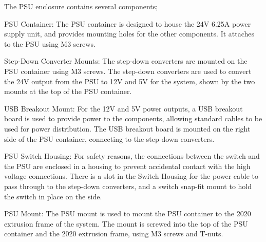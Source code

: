 The PSU enclosure contains several components;
\begin{mylist}
    \item PSU Container: The PSU container is designed to house the 24V 6.25A power supply unit, and provides mounting holes for the other components. It attaches to the PSU using M3 screws.
    \item Step-Down Converter Mounts: The step-down converters are mounted on the PSU container using M3 screws. The step-down converters are used to convert the 24V output from the PSU to 12V and 5V for the system, shown by the two mounts at the top of the PSU container.
    \item USB Breakout Mount: For the 12V and 5V power outputs, a USB breakout board is used to provide power to the components, allowing standard cables to be used for power distribution. The USB breakout board is mounted on the right side of the PSU container, connecting to the step-down converters.
    \item PSU Switch Housing: For safety reasons, the connections between the switch and the PSU are enclosed in a housing to prevent accidental contact with the high voltage connections. There is a slot in the Switch Housing for the power cable to pass through to the step-down converters, and a switch snap-fit mount to hold the switch in place on the side.
    \item PSU Mount: The PSU mount is used to mount the PSU container to the 2020 extrusion frame of the system. The mount is screwed into the top of the PSU container and the 2020 extrusion frame, using M3 screws and T-nuts.
\end{mylist}

